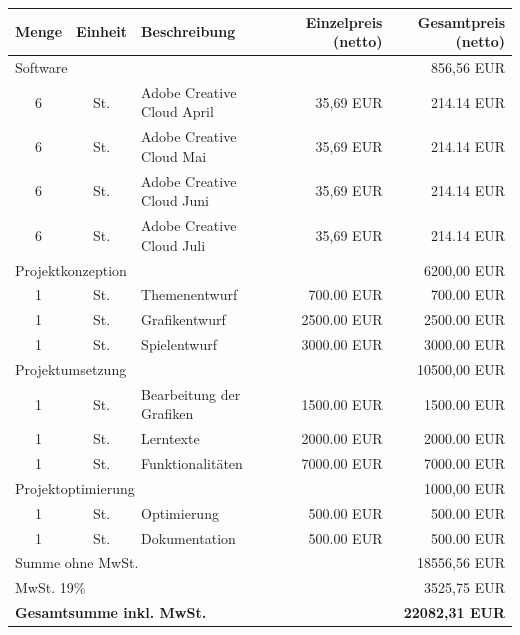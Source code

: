 \documentclass[a4paper, 11pt]{article} %
\begin{document}
\vspace{5pt}
\begin{tabularx}{\textwidth}{ccXrr}
\hline
\tiny {Menge} & \tiny {Einheit} & \tiny {Beschreibung} & \tiny {Einzelpreis (netto)} & \tiny {Gesamtpreis (netto)} \\ \hline
\multicolumn{ 4}{l}{\small{Software}} & 856,56 EUR \\ \hline
 6 & St. & Adobe Creative Cloud April & \multicolumn{1}{r}{35,69 EUR} & \multicolumn{1}{r}{214.14 EUR} \\ \hline \hline
 6 & St. & Adobe Creative Cloud Mai & \multicolumn{1}{r}{35,69 EUR} & \multicolumn{1}{r}{214.14 EUR} \\ \hline \hline
 6 & St. & Adobe Creative Cloud Juni & \multicolumn{1}{r}{35,69 EUR} & \multicolumn{1}{r}{214.14 EUR} \\ \hline \hline
 6 & St. & Adobe Creative Cloud Juli & \multicolumn{1}{r}{35,69 EUR} & \multicolumn{1}{r}{214.14 EUR} \\ \hline \hline
\multicolumn{ 4}{l}{\small{Projektkonzeption}} & 6200,00 EUR \\ \hline
 1 & St. & Themenentwurf & \multicolumn{1}{r}{700.00 EUR} & \multicolumn{1}{r}{700.00 EUR} \\ \hline \hline
 1 & St. & Grafikentwurf & \multicolumn{1}{r}{2500.00 EUR} & \multicolumn{1}{r}{2500.00 EUR} \\ \hline \hline
 1 & St. & Spielentwurf & \multicolumn{1}{r}{3000.00 EUR} & \multicolumn{1}{r}{3000.00 EUR} \\ \hline \hline
\multicolumn{ 4}{l}{\small{Projektumsetzung}} & 10500,00 EUR \\ \hline
 1 & St. & Bearbeitung der Grafiken & \multicolumn{1}{r}{1500.00 EUR} & \multicolumn{1}{r}{1500.00 EUR} \\ \hline \hline
 1 & St. & Lerntexte & \multicolumn{1}{r}{2000.00 EUR} & \multicolumn{1}{r}{2000.00 EUR} \\ \hline \hline
 1 & St. & Funktionalitäten & \multicolumn{1}{r}{7000.00 EUR} & \multicolumn{1}{r}{7000.00 EUR} \\ \hline \hline
\multicolumn{ 4}{l}{\small{Projektoptimierung}} & 1000,00 EUR \\ \hline
 1 & St. & Optimierung & \multicolumn{1}{r}{500.00 EUR} & \multicolumn{1}{r}{500.00 EUR} \\ \hline \hline
 1 & St. & Dokumentation & \multicolumn{1}{r}{500.00 EUR} & \multicolumn{1}{r}{500.00 EUR} \\ \hline \hline
\multicolumn{ 4}{l}{\small{Summe ohne MwSt.}} & 18556,56 EUR \\ \hline
\multicolumn{ 4}{l}{\small{MwSt. 19\% }} & 3525,75 EUR \\ \hline \hline
\multicolumn{ 4}{l}{ \textbf{Gesamtsumme inkl. MwSt.} } & \textbf{22082,31 EUR} \\ \hline
\end{tabularx}
\end{document}
